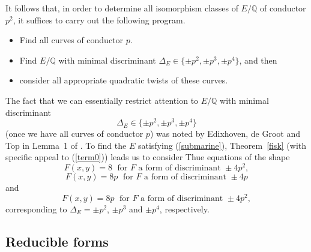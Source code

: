 It follows that, in order to determine all isomorphism classes of $E/\mathbb{Q}$ of conductor $p^2$, it suffices to carry out the following program.
\begin{itemize}
\item Find all curves of conductor $p$.
\item Find $E/\mathbb{Q}$ with minimal discriminant
$\Delta_E \in \{ \pm p^2, \pm p^3, \pm p^4 \}$, and then
\item consider all appropriate quadratic twists of these curves.
\end{itemize}
The fact that we can essentially restrict attention to $E/\mathbb{Q}$ with minimal discriminant
\begin{equation} \label{submarine}
\Delta_E \in \{ \pm p^2, \pm p^3, \pm p^4 \}
\end{equation}
(once we have all curves of conductor $p$) was noted by Edixhoven, de Groot and Top in Lemma~1 of \cite{EGT}. To find the $E$ satisfying (\ref{submarine}), Theorem~\ref{fisk} (with specific appeal to (\ref{term0}))  leads us 
to consider Thue equations of the shape
\begin{equation} \label{fish1}
F(x,y) = 8 \; \mbox{ for  $F$ a form of discriminant }  \pm 4 p^2,
\end{equation}
\begin{equation} \label{fish2}
F(x,y) = 8p \; \mbox{ for  $F$ a form of discriminant }  \pm 4 p
\end{equation}
and
\begin{equation} \label{fish3}
F(x,y) = 8p \; \mbox{ for  $F$ a form of discriminant }  \pm 4 p^2,
\end{equation}
corresponding to $\Delta_E = \pm p^2$, $\pm p^3$ and $\pm p^4$, respectively.



\subsection{Reducible forms}

